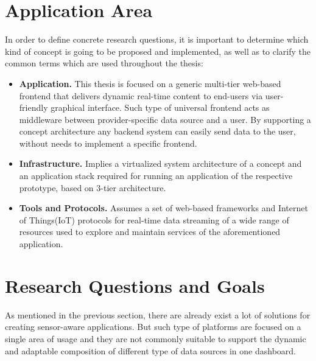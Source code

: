 \section{Application Area}
     In order to define concrete research questions, it is important to determine which kind of concept is going to be proposed and implemented, as well as to clarify the common terms which are used throughout the thesis:
     \begin{itemize}
          \item \textbf{Application.} This thesis is focused on a generic multi-tier web-based frontend that delivers dynamic real-time content to end-users via user-friendly graphical interface. Such type of universal frontend acts as middleware between provider-specific data source and a user. By supporting a concept architecture any backend system can easily send data to the user, without needs to implement a specific frontend.

          \item \textbf{Infrastructure.} Implies a virtualized system architecture of a concept and an application stack required for running an application of the respective prototype, based on 3-tier architecture.

          \item \textbf{Tools and Protocols.} Assumes a set of web-based frameworks and Internet of Things(IoT) protocols for real-time data streaming of a wide range of resources used to explore and maintain services of the aforementioned application.
     \end{itemize}


\section{Research Questions and Goals}
       As mentioned in the previous section, there are already exist a lot of solutions for creating sensor-aware applications. But such type of platforms are focused on a single area of usage and they are not commonly suitable to support the dynamic and adaptable composition of different type of data sources in one dashboard.

